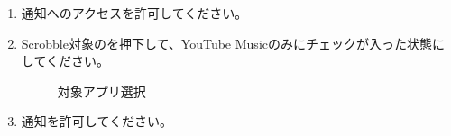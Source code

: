\begin{enumerate}
            \newpage
            \item 通知へのアクセスを許可してください。
            \item Scrobble対象のを押下して、YouTube Musicのみにチェックが入った状態にしてください。
                \begin{figure}[htbp]
                    \begin{minipage}[b]{0.45\linewidth}
                        \centering
                        \label{img:lastfm8}
                    \end{minipage}
                    \begin{minipage}[b]{0.45\linewidth}
                        \centering
                        \label{img:lastfm9}
                    \end{minipage}
                    \caption*{対象アプリ選択}
                \end{figure}
            \item 通知を許可してください。


\end{enumerate}
